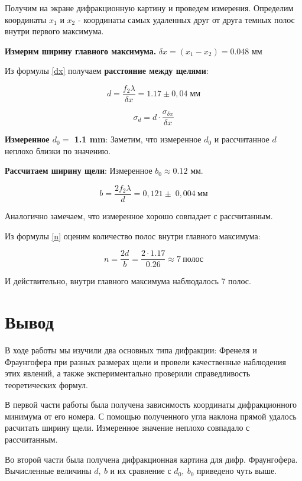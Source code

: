 \documentclass[15pt,a5paper,reqno]{article}
\begin{document}
Получим на экране дифракционную картину и проведем измерения. Определим координаты $x_1$ и $x_2$ - координаты самых удаленных друг от друга темных полос внутри первого максимума.



 \textbf{Измерим ширину главного максимума.}
 \newline
 $  \delta x  = (x_{1} - x_{2} )= 0.048 $ мм

 Из формулы \eqref{dx} получаем \textbf{расстояние между щелями}:
 
 \[d = \dfrac{f_2 \lambda}{\delta x} = 1.17 \pm 0,04 \; \text{мм}\]
 
 \[ \sigma_d = d\cdot \frac{\sigma_{\delta x}}{\delta x}       \]
 
 \textbf{Измеренное $d_0 = $ 1.1 mm}:
\newline
 Заметим, что измеренное $d_0$ и рассчитанное $d$ неплохо близки по значению.
 
\textbf{Рассчитаем ширину щели}:
\newline
Измеренное $b_0 \approx 0.12$ \: мм.
 
 \begin{equation}\label{}
 b = \dfrac{2 f_2 \lambda}{d} = 0,121 \pm \;0,004 \: \text{мм}
 \end{equation}
 
 Аналогично замечаем, что измеренное хорошо совпадает с рассчитанным.
 
 Из формулы \eqref{n} оценим количество полос внутри главного максимума:
 
 \[ n = \frac{2d}{b} = \frac{2 \cdot 1.17}{0.26}  \approx 7 \: \text{полос}   \] 
 
И действительно, внутри главного максимума наблюдалось 7 полос.
 
 \section{Вывод}
 
 В ходе работы мы изучили два основных типа дифракции: Френеля и Фраунгофера при разных размерах щели и провели качественные наблюдения этих явлений, а также экспериментально проверили справедливость теоретических формул.  
 
 В первой части работы была получена зависимость координаты дифракционного минимума от его номера. 
 С помощью полученного угла наклона прямой удалось расчитать ширину щели. Измеренное значение неплохо совпадало с рассчитанным.
 
Во второй части была получена дифракционная картина для дифр. Фраунгофера. Вычисленные величины $d, \: b$ и их сравнение с $d_0, \: b_0$ приведено чуть выше.

\newpage
\end{document}

